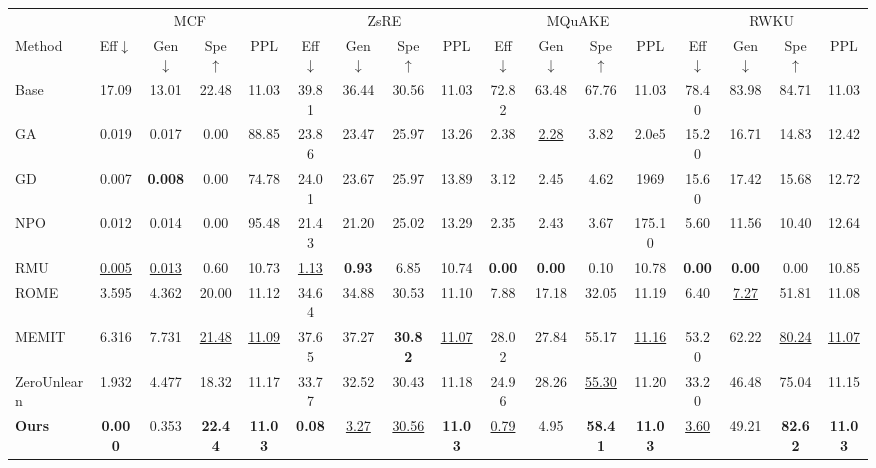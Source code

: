 \documentclass{article}
\theoremstyle{remark}
\theoremstyle{definition}
\begin{document}
\begin{table}[t]
\centering
\small
\setlength{\tabcolsep}{3.2pt}
\begin{tabular}{l cccc cccc cccc cccc}
\toprule
& \multicolumn{4}{c}{MCF} & \multicolumn{4}{c}{ZsRE} & \multicolumn{4}{c}{MQuAKE} & \multicolumn{4}{c}{RWKU} \\
\cmidrule(lr){2-5}\cmidrule(lr){6-9}\cmidrule(lr){10-13}\cmidrule(lr){14-17}
Method & Eff$\downarrow$ & Gen$\downarrow$ & Spe$\uparrow$ & PPL & Eff$\downarrow$ & Gen$\downarrow$ & Spe$\uparrow$ & PPL & Eff$\downarrow$ & Gen$\downarrow$ & Spe$\uparrow$ & PPL & Eff$\downarrow$ & Gen$\downarrow$ & Spe$\uparrow$ & PPL \\
\midrule
Base        & 17.09 & 13.01 & 22.48 & 11.03 & 39.81 & 36.44 & 30.56 & 11.03 & 72.82 & 63.48 & 67.76 & 11.03 & 78.40 & 83.98 & 84.71 & 11.03 \\
\midrule
GA          & 0.019 & 0.017 & 0.00 & 88.85 & 23.86 & 23.47 & 25.97 & 13.26 & 2.38 & \underline{2.28} & 3.82 & 2.0e5 & 15.20 & 16.71 & 14.83 & 12.42 \\
GD          & 0.007 & \textbf{0.008} & 0.00 & 74.78 & 24.01 & 23.67 & 25.97 & 13.89 & 3.12 & 2.45 & 4.62 & 1969 & 15.60 & 17.42 & 15.68 & 12.72 \\
NPO         & 0.012 & 0.014 & 0.00 & 95.48 & 21.43 & 21.20 & 25.02 & 13.29 & 2.35 & 2.43 & 3.67 & 175.10 & 5.60 & 11.56 & 10.40 & 12.64 \\
RMU         & \underline{0.005} & \underline{0.013} & 0.60 & 10.73 & \underline{1.13} & \textbf{0.93} & 6.85 & 10.74 & \textbf{0.00} & \textbf{0.00} & 0.10 & 10.78 & \textbf{0.00} & \textbf{0.00} & 0.00 & 10.85 \\
ROME        & 3.595 & 4.362 & 20.00 & 11.12 & 34.64 & 34.88 & 30.53 & 11.10 & 7.88 & 17.18 & 32.05 & 11.19 & 6.40 & \underline{7.27} & 51.81 & 11.08 \\
MEMIT       & 6.316 & 7.731 & \underline{21.48} & \underline{11.09} & 37.65 & 37.27 & \textbf{30.82} & \underline{11.07} & 28.02 & 27.84 & 55.17 & \underline{11.16} & 53.20 & 62.22 & \underline{80.24} & \underline{11.07} \\
ZeroUnlearn & 1.932 & 4.477 & 18.32 & 11.17 & 33.77 & 32.52 & 30.43 & 11.18 & 24.96 & 28.26 & \underline{55.30} & 11.20 & 33.20 & 46.48 & 75.04 & 11.15 \\
\midrule
\textbf{Ours}& \textbf{0.000} & 0.353 & \textbf{22.44} & \textbf{11.03} & \textbf{0.08} & \underline{3.27} & \underline{30.56} & \textbf{11.03} & \underline{0.79} & 4.95 & \textbf{58.41} & \textbf{11.03} & \underline{3.60} & 49.21 & \textbf{82.62} & \textbf{11.03} \\

\end{tabular}
\end{table}
\end{document}
